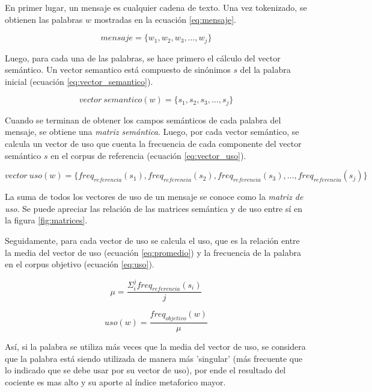 \documentclass[12pt,letterpaper,twoside]{article}
\begin{document}
En primer lugar, un mensaje es cualquier cadena de texto. Una vez
tokenizado, se obtienen las palabras \(w\) mostradas en la ecuación
\ref{eq:mensaje}.

\begin{equation}
\label{eq:mensaje}
mensaje = \{ w_1, w_2, w_3, \dots , w_j \}
\end{equation}


 Luego, para cada una de las palabras, se hace
primero el cálculo del vector semántico. Un vector semantico está
compuesto de sinónimos \(s\) del la palabra inicial (ecuación
\ref{eq:vector_semantico}).


\begin{equation}
\label{eq:vector_semantico}
vector\ semantico(w) = \{s_1, s_2, s_3, \dots, s_j \} 
\end{equation}


Cuando se terminan de obtener los campos semánticos de cada palabra del
mensaje, se obtiene una \emph{matriz semántica}. Luego, por cada vector
semántico, se calcula un vector de uso que cuenta la frecuencia de
cada componente del vector semántico \(s\) en el corpus de referencia
(ecuación \ref{eq:vector_uso}).

\begin{equation}
\label{eq:vector_uso}
vector\ uso(w) = \{freq_{referencia}(s_1),freq_{referencia}(s_2),freq_{referencia}(s_3), \dots, freq_{referencia}(s_j) \} 
\end{equation}


La suma de todos los vectores de uso de un mensaje se conoce como la
\emph{matriz de uso}. Se puede apreciar las relación de las matrices
semántica y de uso entre sí en la figura \ref{fig:matrices}.


Seguidamente, para cada vector de uso se calcula el uso, que es la
relación entre la media del vector de uso (ecuación \ref{eq:promedio})
y la frecuencia de la palabra en el corpus objetivo (ecuación
\ref{eq:uso}).


\begin{equation}
\label{eq:promedio}
\mu = \frac{\Sigma_i^jfreq_{referencia}(s_i)}{j}
\end{equation}

\begin{equation}
\label{eq:uso}
uso(w) = \frac{freq_{objetivo}(w)}{\mu}
\end{equation}

Así, si la palabra se utiliza más veces que la media del vector de
uso, se considera que la palabra está siendo utilizada de manera más
'singular' (más frecuente que lo indicado que se debe usar por su
vector de uso), por ende el resultado del cociente es mas alto y su
aporte al índice metaforico mayor.
\end{document}
